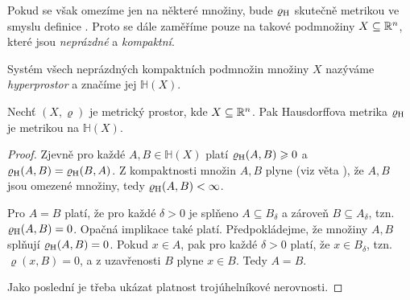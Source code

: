 Pokud se však omezíme jen na některé množiny, bude $\varrho_\textup{H}$ skutečně metrikou ve smyslu definice . Proto se dále zaměříme pouze na takové podmnožiny $X\subseteq\mathbb{R}^n$, které jsou \emph{neprázdné} a \emph{kompaktní}.
\begin{definition}[Hyperprostor]\label{def:hyperprostor}
    Systém všech neprázdných kompaktních podmnožin množiny $X$ nazýváme \emph{hyperprostor} a značíme jej $\mathbb{H}(X)$.
\end{definition}
\begin{theorem}\label{thm:hausdorffova-metrika-je-metrika}
    Nechť $(X,\varrho)$ je metrický prostor, kde $X\subseteq\mathbb{R}^n$. Pak Hausdorffova metrika $\varrho_\textup{H}$ je metrikou na $\mathbb{H}(X)$.
\end{theorem}
\begin{proof}
    Zjevně pro každé $A,B\in\mathbb{H}(X)$ platí $\varrho_\textup{H}(A,B)\geqslant 0$ a $\varrho_\textup{H}(A,B)=\varrho_\textup{H}(B,A)$. Z kompaktnosti množin $A,B$ plyne (viz věta ), že $A,B$ jsou omezené množiny, tedy $\varrho_\textup{H}(A,B)<\infty$.
    
    Pro $A=B$ platí, že pro každé $\delta>0$ je splňeno $A\subseteq B_\delta$ a zároveň $B\subseteq A_\delta$, tzn. $\varrho_\textup{H}(A,B)=0$. Opačná implikace také platí. Předpokládejme, že množiny $A,B$ splňují $\varrho_\textup{H}(A,B)=0$. Pokud $x\in A$, pak pro každé $\delta>0$ platí, že $x\in B_\delta$, tzn. $\varrho(x,B)=0$, a z uzavřenosti $B$ plyne $x\in B$. Tedy $A=B$.

    Jako poslední je třeba ukázat platnost trojúhelníkové nerovnosti. 
\end{proof}